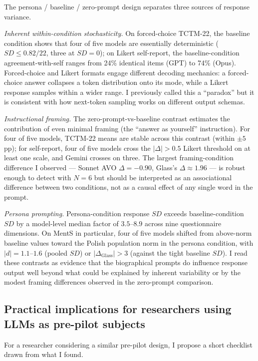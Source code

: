 \documentclass[11pt,a4paper]{article}
\begin{document}
The persona / baseline / zero-prompt design separates three sources of response variance.

\emph{Inherent within-condition stochasticity.} On forced-choice TCTM-22, the baseline condition shows that four of five models are essentially deterministic ($SD \leq 0.82 / 22$, three at $SD = 0$); on Likert self-report, the baseline-condition agreement-with-self ranges from 24\% identical items (GPT) to 74\% (Opus). Forced-choice and Likert formats engage different decoding mechanics: a forced-choice answer collapses a token distribution onto its mode, while a Likert response samples within a wider range. I previously called this a ``paradox'' but it is consistent with how next-token sampling works on different output schemas.

\emph{Instructional framing.} The zero-prompt-vs-baseline contrast estimates the contribution of even minimal framing (the ``answer as yourself'' instruction). For four of five models, TCTM-22 means are stable across this contrast (within $\pm 5$ pp); for self-report, four of five models cross the $|\Delta| > 0.5$ Likert threshold on at least one scale, and Gemini crosses on three. The largest framing-condition difference I observed --- Sonnet AVO $\Delta = -0.90$, Glass's $\Delta \approx 1.96$ --- is robust enough to detect with $N = 6$ but should be interpreted as an associational difference between two conditions, not as a causal effect of any single word in the prompt.

\emph{Persona prompting.} Persona-condition response $SD$ exceeds baseline-condition $SD$ by a model-level median factor of $3.5$--$8.9$ across nine questionnaire dimensions. On MentS in particular, four of five models shifted from above-norm baseline values toward the Polish population norm in the persona condition, with $|d| = 1.1$--$1.6$ (pooled $SD$) or $|\Delta_{\text{Glass}}| > 3$ (against the tight baseline $SD$). I read these contrasts as evidence that the biographical prompts do influence response output well beyond what could be explained by inherent variability or by the modest framing differences observed in the zero-prompt comparison.

\subsection{Practical implications for researchers using LLMs as pre-pilot subjects}

For a researcher considering a similar pre-pilot design, I propose a short checklist drawn from what I found.
\end{document}
